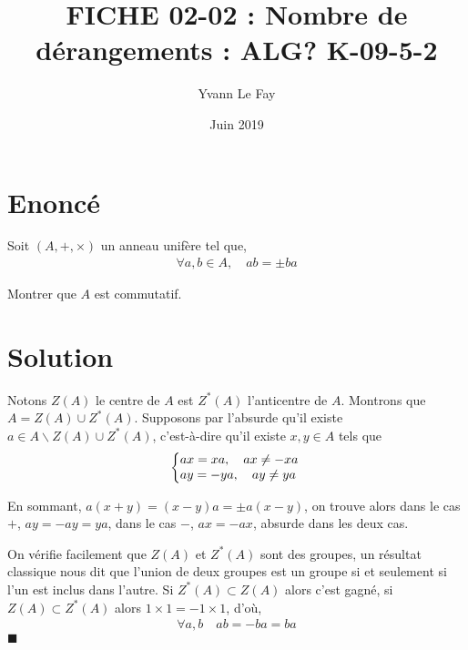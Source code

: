 \documentclass{article}
\newcommand*{\QED}{\hfill\ensuremath{\blacksquare}}%
\begin{document}
\title{FICHE 02-02 : Nombre de dérangements : ALG? K-09-5-2}
\author{Yvann Le Fay}
\date{Juin 2019}
\maketitle
\section*{Enoncé}
Soit $(A,+,\times)$ un anneau unifère tel que,
\begin{align*}
\forall a,b\in A, \quad ab=\pm ba
\end{align*}

Montrer que $A$ est commutatif.
\section*{Solution}
Notons $Z(A)$ le centre de $A$ est $Z^*(A)$ l'anticentre de $A$. Montrons que $A=Z(A)\cup Z^*(A)$. Supposons par l'absurde qu'il existe $a\in A\backslash Z(A)\cup Z^*(A)$, c'est-à-dire qu'il existe $x,y\in A$ tels que 
\begin{align*}
\left\{
     \begin{array}{@{}l@{\thinspace}l}
     ax=xa, \quad ax\neq -xa\\
     ay=-ya, \quad ay\neq ya
     \end{array}
   \right.   
\end{align*}

En sommant, $a(x+y)=(x-y)a=\pm a(x-y)$, on trouve alors dans le cas $+$, $ay=-ay=ya$, dans le cas $-$, $ax=-ax$, absurde dans les deux cas.

On vérifie facilement que $Z(A)$ et $Z^*(A)$ sont des groupes, un résultat classique nous dit que l'union de deux groupes est un groupe si et seulement si l'un est inclus dans l'autre. Si $Z^*(A)\subset Z(A)$ alors c'est gagné, si $Z(A)\subset Z^*(A)$ alors $1\times 1 = -1\times 1$, d'où,
\begin{align*}
\forall a,b\quad ab=-ba=ba
\end{align*}
\QED
\end{document}
